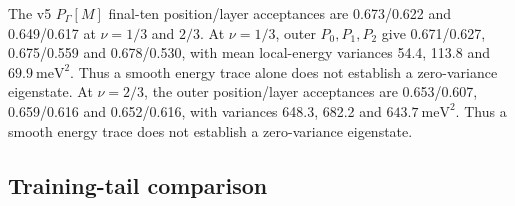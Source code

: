 \begin{table}[H]
\centering
\caption{Final-ten training diagnostics.  Energies are meV per particle;
RMS is training-chain scatter.}
\label{tab:adaptive-training}
\end{table}
The v5 $P_\Gamma[M]$ final-ten position/layer acceptances are 0.673/0.622
and 0.649/0.617 at $\nu=1/3$ and $2/3$. At $\nu=1/3$, outer
$P_0,P_1,P_2$ give 0.671/0.627, 0.675/0.559 and 0.678/0.530, with mean
local-energy variances 54.4, 113.8 and $69.9~\mathrm{meV}^2$. Thus a smooth
energy trace alone does not establish a zero-variance eigenstate.
At $\nu=2/3$, the outer position/layer acceptances are 0.653/0.607,
0.659/0.616 and 0.652/0.616, with variances 648.3, 682.2 and
$643.7~\mathrm{meV}^2$. Thus a smooth energy trace does not establish a
zero-variance eigenstate.

\subsection{Training-tail comparison}

